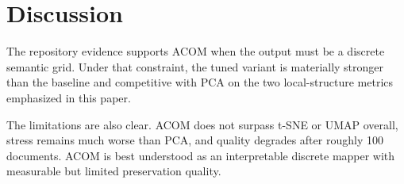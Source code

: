 \section{Discussion}

The repository evidence supports ACOM when the output must be a discrete semantic grid. Under that constraint, the tuned variant is materially stronger than the baseline and competitive with PCA on the two local-structure metrics emphasized in this paper.

The limitations are also clear. ACOM does not surpass t-SNE or UMAP overall, stress remains much worse than PCA, and quality degrades after roughly 100 documents. ACOM is best understood as an interpretable discrete mapper with measurable but limited preservation quality.

